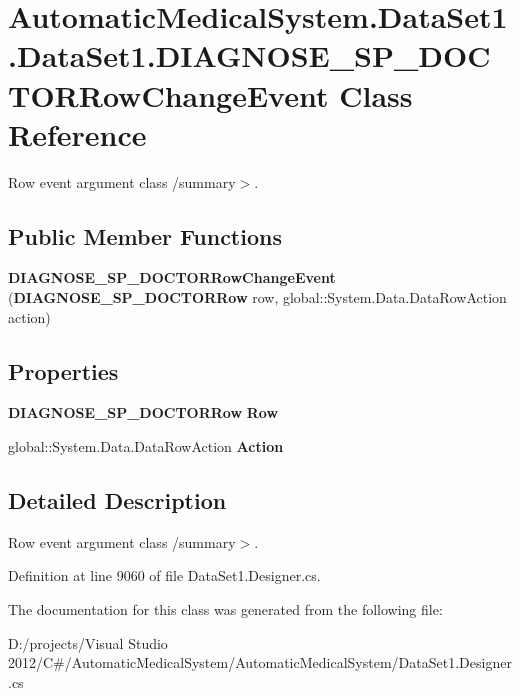 \section{AutomaticMedicalSystem.DataSet1.DataSet1.DIAGNOSE\_\-SP\_\-DOCTORRowChangeEvent Class Reference}
\label{class_automatic_medical_system_1_1_data_set1_1_1_d_i_a_g_n_o_s_e___s_p___d_o_c_t_o_r_row_change_event}
Row event argument class /summary$>$.  


\subsection*{Public Member Functions}
\begin{CompactItemize}
\item 
\textbf{DIAGNOSE\_\-SP\_\-DOCTORRowChangeEvent} ({\bf DIAGNOSE\_\-SP\_\-DOCTORRow} row, global::System.Data.DataRowAction action)\label{class_automatic_medical_system_1_1_data_set1_1_1_d_i_a_g_n_o_s_e___s_p___d_o_c_t_o_r_row_change_event_3c09d1511aff9e0fd582c5b9530a47d4}

\end{CompactItemize}
\subsection*{Properties}
\begin{CompactItemize}
\item 
{\bf DIAGNOSE\_\-SP\_\-DOCTORRow} \textbf{Row}\hspace{0.3cm}{\tt  [get]}\label{class_automatic_medical_system_1_1_data_set1_1_1_d_i_a_g_n_o_s_e___s_p___d_o_c_t_o_r_row_change_event_a6e2b081fc760d7709483fbd55a3252a}

\item 
global::System.Data.DataRowAction \textbf{Action}\hspace{0.3cm}{\tt  [get]}\label{class_automatic_medical_system_1_1_data_set1_1_1_d_i_a_g_n_o_s_e___s_p___d_o_c_t_o_r_row_change_event_c6dce737591c153ecde3044909b6df57}

\end{CompactItemize}


\subsection{Detailed Description}
Row event argument class /summary$>$. 

Definition at line 9060 of file DataSet1.Designer.cs.

The documentation for this class was generated from the following file:\begin{CompactItemize}
\item 
D:/projects/Visual Studio 2012/C\#/AutomaticMedicalSystem/AutomaticMedicalSystem/DataSet1.Designer.cs\end{CompactItemize}
